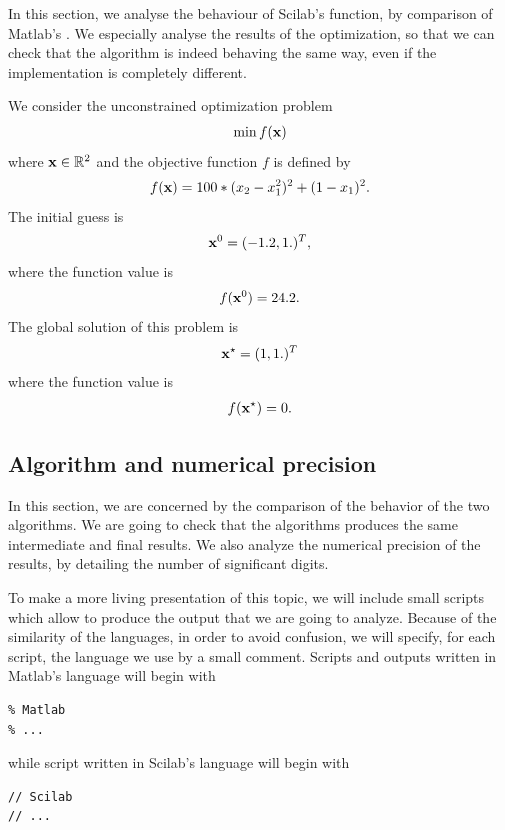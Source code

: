 In this section, we analyse the behaviour of Scilab's 
function, by comparison of Matlab's . We especially analyse 
the results of the optimization, so that we can check that the algorithm
is indeed behaving the same way, even if the implementation is completely 
different. 

We consider the unconstrained optimization problem \cite{citeulike:1903787}
\begin{eqnarray}
\min f(\mathbf{x})
\end{eqnarray}
where $\mathbf{x}\in\mathbb{R}^2$ and the objective function $f$ is defined by 
\begin{eqnarray}
f(\mathbf{x}) = 100*(x_2-x_1^2)^2+(1-x_1)^2.
\end{eqnarray}
The initial guess is 
\begin{eqnarray}
\mathbf{x}^0 = ( -1.2 , 1.)^T,
\end{eqnarray}
where the function value is 
\begin{eqnarray}
f(\mathbf{x}^0) = 24.2.
\end{eqnarray}
The global solution of this problem is
\begin{eqnarray}
\mathbf{x}^\star = ( 1 , 1.)^T
\end{eqnarray}
where the function value is 
\begin{eqnarray}
f(\mathbf{x}^\star) = 0.
\end{eqnarray}

\subsection{Algorithm and numerical precision}

In this section, we are concerned by the comparison of the behavior 
of the two algorithms. We are going to check that the algorithms 
produces the same intermediate and final results.
We also analyze the numerical precision of the results,
by detailing the number of significant digits.

To make a more living presentation of this topic, we will 
include small scripts which allow to produce the output 
that we are going to analyze. Because of the similarity of the languages, 
in order to avoid confusion, we will specify, for each script, the language 
we use by a small comment. Scripts and outputs written in Matlab's language will begin with 
\lstset{language=matlabscript}
\begin{lstlisting}
% Matlab
% ...
\end{lstlisting}
while script written in Scilab's language will begin with
\lstset{language=scilabscript}
\begin{lstlisting}
// Scilab
// ...
\end{lstlisting}

